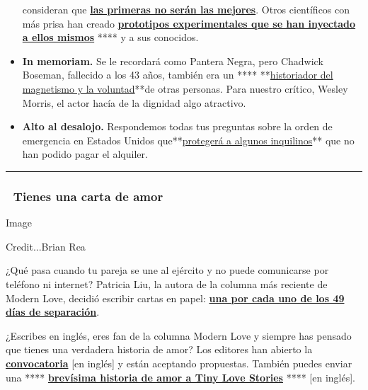 \begin{itemize}
  consideran que
  \textbf{\href{https://www.nytimes3xbfgragh.onion/es/2020/09/01/espanol/ciencia-y-tecnologia/vacuna-coronavirus.html}{las
  primeras no serán las mejores}}. Otros científicos con más prisa han
  creado
  \textbf{\href{https://www.nytimes3xbfgragh.onion/es/2020/09/02/espanol/ciencia-y-tecnologia/vacunas-experimentales-coronavirus.html}{prototipos
  experimentales que se han inyectado a ellos mismos}} **** y a sus
  conocidos.
\item
  \textbf{In memoriam.} Se le recordará como Pantera Negra, pero
  Chadwick Boseman, fallecido a los 43 años, también era un ****
  **\href{https://www.nytimes3xbfgragh.onion/es/2020/09/01/espanol/cultura/chadwick-boseman.html}{historiador
  del magnetismo y la voluntad}**de otras personas. Para nuestro
  crítico, Wesley Morris, el actor hacía de la dignidad algo atractivo.
\item
  \textbf{Alto al desalojo.} Respondemos todas tus preguntas sobre la
  orden de emergencia en Estados Unidos
  que**\href{https://www.nytimes3xbfgragh.onion/es/2020/09/02/espanol/negocios/desalojos-trump.html}{protegerá
  a algunos inquilinos}** que no han podido pagar el alquiler.
\end{itemize}

\begin{center}\rule{0.5\linewidth}{\linethickness}\end{center}

\hypertarget{-tienes-una-carta-de-amor-}{%
\subsubsection{💌 Tienes una carta de amor
💌}\label{-tienes-una-carta-de-amor-}}

Image

Credit...Brian Rea

¿Qué pasa cuando tu pareja se une al ejército y no puede comunicarse por
teléfono ni internet? Patricia Liu, la autora de la columna más reciente
de Modern Love, decidió escribir cartas en papel:
\textbf{\href{https://www.nytimes3xbfgragh.onion/es/2020/08/30/espanol/estilos-de-vida/entrenamiento-militar-amor.html}{una
por cada uno de los 49 días de separación}}.

¿Escribes en inglés, eres fan de la columna Modern Love y siempre has
pensado que tienes una verdadera historia de amor? Los editores han
abierto la
\textbf{\href{https://www.nytimes3xbfgragh.onion/article/how-to-submit-a-modern-love-essay.html}{convocatoria}}
{[}en inglés{]} y están aceptando propuestas. También puedes enviar una
****
\textbf{\href{https://www.nytimes3xbfgragh.onion/2018/09/19/style/modern-love-tiny-love-stories.html}{brevísima
historia de amor a Tiny Love Stories}} **** {[}en inglés{]}.


